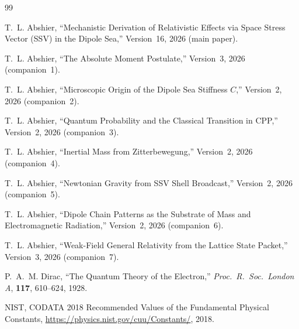 \documentclass[12pt]{article}
\begin{document}
\begin{thebibliography}{99}

T.~L. Abshier,
``Mechanistic Derivation of Relativistic Effects via Space Stress
Vector (SSV) in the Dipole Sea,''
Version~16, 2026 (main paper).

T.~L. Abshier,
``The Absolute Moment Postulate,''
Version~3, 2026 (companion~1).

T.~L. Abshier,
``Microscopic Origin of the Dipole Sea Stiffness $C$,''
Version~2, 2026 (companion~2).

T.~L. Abshier,
``Quantum Probability and the Classical Transition in CPP,''
Version~2, 2026 (companion~3).

T.~L. Abshier,
``Inertial Mass from Zitterbewegung,''
Version~2, 2026 (companion~4).

T.~L. Abshier,
``Newtonian Gravity from SSV Shell Broadcast,''
Version~2, 2026 (companion~5).

T.~L. Abshier,
``Dipole Chain Patterns as the Substrate of Mass and
Electromagnetic Radiation,''
Version~2, 2026 (companion~6).

T.~L. Abshier,
``Weak-Field General Relativity from the Lattice State Packet,''
Version~3, 2026 (companion~7).

P.~A.~M. Dirac,
``The Quantum Theory of the Electron,''
\textit{Proc.\ R.\ Soc.\ London A}, \textbf{117}, 610--624, 1928.

NIST, CODATA 2018 Recommended Values of the Fundamental Physical
Constants,
\url{https://physics.nist.gov/cuu/Constants/}, 2018.

\end{thebibliography}
\end{document}
